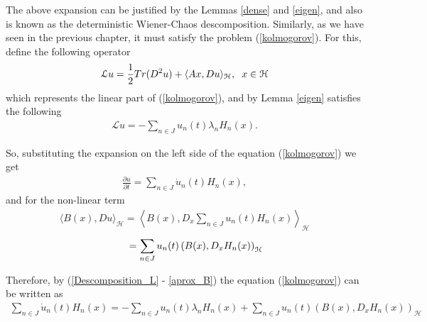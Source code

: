 	The above expansion can be justified by the Lemmas \ref{dense} and \ref{eigen}, and also is known as the deterministic Wiener-Chaos descomposition. Similarly, as we have seen in the previous chapter, it must satisfy the problem (\ref{kolmogorov}). For this, define the following operator
	\begin{align}
	\label{operator_L}
		\mathcal{L} u = \frac{1}{2} Tr(D^2 u) + \langle Ax, Du\rangle_{\mathcal{H}}, \hspace{2mm} x \in \mathcal{H}
	\end{align}
	which represents the linear part of (\ref{kolmogorov}), and by Lemma \ref{eigen} satisfies the following
	\begin{align}
		\label{Descomposition_L}
		\mathcal{L} u = - \sum_{n \in J} u_n (t) \lambda_n H_n (x).
	\end{align}	
	
	So, substituting the expansion on the left side of the equation (\ref{kolmogorov}) we get 
	\begin{align}
		\label{aprox_time}
		\frac{\partial u}{\partial t} = \displaystyle \sum_{n \in J}  \dot{u}_n (t) H_n (x),
	\end{align} 
	and for the non-linear term 
	\begin{align*}
		\langle B(x), Du\rangle_{\mathcal{H}} = \left\langle B(x), D_x \displaystyle \sum_{n \in J} u_n (t) H_n (x)  \right\rangle_{\mathcal{H}} 
	\end{align*}	
	\begin{align}
		\label{aprox_B}
		\hspace{8mm} = \displaystyle \sum_{n \in J} u_n (t) \left( B(x), D_x H_n (x) \right)_{\mathcal{H}}
	\end{align}
	
	Therefore, by (\ref{Descomposition_L} - \ref{aprox_B}) the equation (\ref{kolmogorov}) can be written as
	\begin{align*}
		\displaystyle \sum_{n \in J}  \dot{u}_n (t) H_n (x) = - \sum_{n \in J} u_n (t) \lambda_n H_n (x) + \sum_{n \in J} u_n (t) \left( B(x), D_x H_n (x) \right)_{\mathcal{H}}
	\end{align*}

